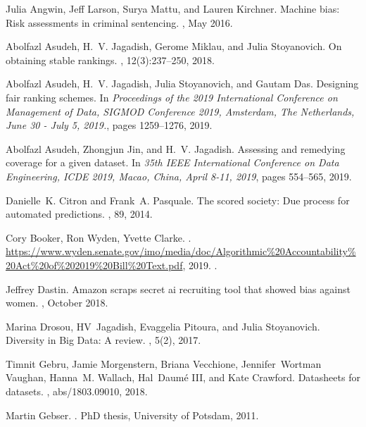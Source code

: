 
Julia Angwin, Jeff Larson, Surya Mattu, and Lauren Kirchner.
\newblock Machine bias: Risk assessments in criminal sentencing.
, May 2016.

Abolfazl Asudeh, H.~V. Jagadish, Gerome Miklau, and Julia Stoyanovich.
\newblock On obtaining stable rankings.
, 12(3):237--250, 2018.

Abolfazl Asudeh, H.~V. Jagadish, Julia Stoyanovich, and Gautam Das.
\newblock Designing fair ranking schemes.
\newblock In {\em Proceedings of the 2019 International Conference on
  Management of Data, {SIGMOD} Conference 2019, Amsterdam, The Netherlands,
  June 30 - July 5, 2019.}, pages 1259--1276, 2019.

Abolfazl Asudeh, Zhongjun Jin, and H.~V. Jagadish.
\newblock Assessing and remedying coverage for a given dataset.
\newblock In {\em 35th {IEEE} International Conference on Data Engineering,
  {ICDE} 2019, Macao, China, April 8-11, 2019}, pages 554--565, 2019.

Danielle~K. Citron and Frank~A. Pasquale.
\newblock The scored society: Due process for automated predictions.
, 89, 2014.

{Cory Booker, Ron Wyden, Yvette Clarke}.
.
\newblock
  \url{https://www.wyden.senate.gov/imo/media/doc/Algorithmic\%20Accountability\%20Act\%20of\%202019\%20Bill\%20Text.pdf},
  2019.
.

Jeffrey Dastin.
\newblock Amazon scraps secret ai recruiting tool that showed bias against
  women.
, October 2018.

Marina Drosou, HV~Jagadish, Evaggelia Pitoura, and Julia Stoyanovich.
\newblock Diversity in {Big Data}: A review.
, 5(2), 2017.

Timnit Gebru, Jamie Morgenstern, Briana Vecchione, Jennifer~Wortman Vaughan,
  Hanna~M. Wallach, Hal~Daum{\'{e}} III, and Kate Crawford.
\newblock Datasheets for datasets.
, abs/1803.09010, 2018.

Martin Gebser.
.
\newblock PhD thesis, University of Potsdam, 2011.

